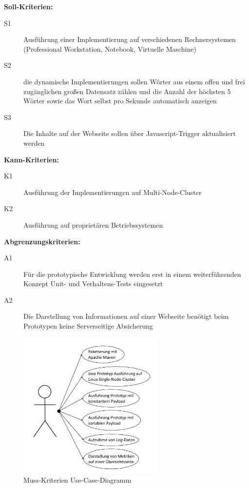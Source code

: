 \textbf{Soll-Kriterien:}
\begin{description}
  \item[S1] Ausführung einer Implementierung auf verschiedenen Rechnersystemen (Professional Workstation, Notebook, Virtuelle Maschine)
	\item[S2] die dynamische Implementierungen sollen Wörter aus einem offen und frei zugänglichen großen Datensatz zählen und die Anzahl der höchsten 5 Wörter sowie das Wort selbst pro Sekunde automatisch anzeigen
	\item[S3] Die Inhalte auf der Webseite sollen über Javascript-Trigger aktualisiert werden
\end{description}

\textbf{Kann-Kriterien:}
\begin{description}
  \item[K1] Ausführung der Implementierungen auf Multi-Node-Cluster
	\item[K2] Ausführung auf proprietären Betriebssystemen
\end{description}

\textbf{Abgrenzungskriterien:}
\begin{description}
  \item[A1] Für die prototypische Entwicklung werden erst in einem weiterführenden Konzept Unit- und Verhaltens-Tests eingesetzt
	\item[A2] Die Darstellung von Informationen auf einer Webseite benötigt beim Prototypen keine Serverseitige Absicherung
\end{description}


\begin{figure}[htb!]
\centering
\includegraphics[width=0.65\textwidth]{bilder/useCaseMussKriterien.png}
\caption{Muss-Kriterien Use-Case-Diagramm
\label{fig:useCaseMussKriterien}}
\end{figure}

